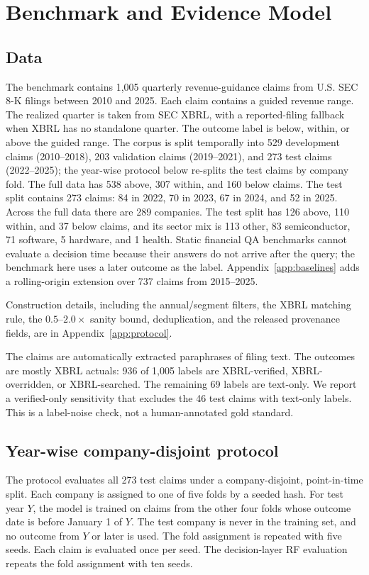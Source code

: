 \documentclass[11pt]{article}
\begin{document}
\section{Benchmark and Evidence Model}
\label{sec:benchmark}

\subsection{Data}
The benchmark contains 1,005 quarterly revenue-guidance claims from U.S. SEC 8-K filings between 2010 and 2025. Each claim contains a guided revenue range. The realized quarter is taken from SEC XBRL, with a reported-filing fallback when XBRL has no standalone quarter. The outcome label is below, within, or above the guided range. The corpus is split temporally into 529 development claims (2010--2018), 203 validation claims (2019--2021), and 273 test claims (2022--2025); the year-wise protocol below re-splits the test claims by company fold. The full data has 538 above, 307 within, and 160 below claims. The test split contains 273 claims: 84 in 2022, 70 in 2023, 67 in 2024, and 52 in 2025. Across the full data there are 289 companies. The test split has 126 above, 110 within, and 37 below claims, and its sector mix is 113 other, 83 semiconductor, 71 software, 5 hardware, and 1 health. Static financial QA benchmarks \citep{chen2021finqa,zhu2021tatqa,islam2023financebench,liu2024finben} cannot evaluate a decision time because their answers do not arrive after the query; the benchmark here uses a later outcome as the label. Appendix~\ref{app:baselines} adds a rolling-origin extension over 737 claims from 2015--2025.

Construction details, including the annual/segment filters, the XBRL matching rule, the $0.5$--$2.0\times$ sanity bound, deduplication, and the released provenance fields, are in Appendix~\ref{app:protocol}.

The claims are automatically extracted paraphrases of filing text. The outcomes are mostly XBRL actuals: 936 of 1,005 labels are XBRL-verified, XBRL-overridden, or XBRL-searched. The remaining 69 labels are text-only. We report a verified-only sensitivity that excludes the 46 test claims with text-only labels. This is a label-noise check, not a human-annotated gold standard.

\subsection{Year-wise company-disjoint protocol}
The protocol evaluates all 273 test claims under a company-disjoint, point-in-time split. Each company is assigned to one of five folds by a seeded hash. For test year $Y$, the model is trained on claims from the other four folds whose outcome date is before January 1 of $Y$. The test company is never in the training set, and no outcome from $Y$ or later is used. The fold assignment is repeated with five seeds. Each claim is evaluated once per seed. The decision-layer RF evaluation repeats the fold assignment with ten seeds.
\end{document}
